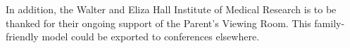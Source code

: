 \documentclass[twocolumn]{bmcart}%
\begin{document}

In addition, the Walter and Eliza Hall Institute of Medical Research is to be thanked for their ongoing support of the Parent's Viewing Room.  This family-friendly model could be exported to conferences elsewhere.



\end{document}
